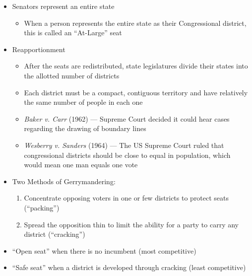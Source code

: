 \documentclass[12pt]{article}
\begin{document}
\begin{itemize}
  \item Senators represent an entire state

    \begin{itemize}

      \item When a person represents the entire state as their Congressional district, this is called an “At-Large” seat

    \end{itemize}

  \item Reapportionment

    \begin{itemize}

      \item After the seats are redistributed, state legislatures divide their states into the allotted number of districts

      \item Each district must be a compact, contiguous territory and have relatively the same number of people in each one

      \item \textit{Baker v. Carr} (1962) — Supreme Court decided it could hear cases regarding the drawing of boundary lines

      \item \textit{Wesberry v. Sanders} (1964) — The US Supreme Court ruled that congressional districts should be close to equal in population, which would mean one man equals one vote

    \end{itemize}

  \item Two Methods of Gerrymandering:

    \begin{enumerate}

      \item Concentrate opposing voters in one or few districts to protect seats (“packing”)

      \item Spread the opposition thin to limit the ability for a party to carry any district (“cracking”)

    \end{enumerate}

  \item “Open seat” when there is no incumbent (most competitive)

  \item “Safe seat” when a district is developed through cracking (least competitive)


\end{itemize}
\end{document}
